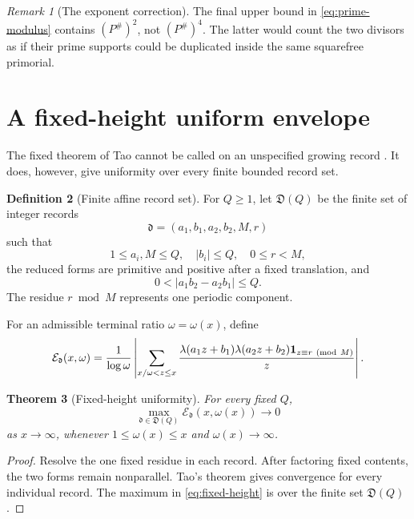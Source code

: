 \documentclass[11pt]{article}
\newtheorem{theorem}{Theorem}[section]
\theoremstyle{definition}
\newtheorem{definition}[theorem]{Definition}
\theoremstyle{remark}
\newtheorem{remark}[theorem]{Remark}
\newcommand{\one}{\mathbf 1}
\begin{document}
\begin{remark}[The exponent correction]
The final upper bound in \eqref{eq:prime-modulus} contains
\((P^\#)^2\), not \((P^\#)^4\).  The latter would count the two
divisors as if their prime supports could be duplicated inside the
same squarefree primorial.
\end{remark}

\section{A fixed-height uniform envelope}

The fixed theorem of Tao cannot be called on an unspecified growing
record \citep{Tao2016LogChowla,WangTPC129}.  It does, however, give
uniformity over every finite bounded record set.

\begin{definition}[Finite affine record set]
\label{def:records}
For \(Q\ge1\), let \(\mathfrak D(Q)\) be the finite set of integer
records
\[
 \mathfrak d=(a_1,b_1,a_2,b_2,M,r)
\]
such that
\[
 1\le a_i,M\le Q,\quad |b_i|\le Q,\quad0\le r<M,
\]
the reduced forms are primitive and positive after a fixed
translation, and
\[
 0<|a_1b_2-a_2b_1|\le Q.
\]
The residue \(r\bmod M\) represents one periodic component.
\end{definition}

For an admissible terminal ratio \(\omega=\omega(x)\), define
\[
 \mathcal E_{\mathfrak d}(x,\omega)
 =
 \frac1{\log\omega}
 \left|
 \sum_{x/\omega<z\le x}
 \frac{
 \lambda(a_1z+b_1)\lambda(a_2z+b_2)
 \one_{z\equiv r\ ({\rm mod}\ M)}
 }z
 \right|.
\]

\begin{theorem}[Fixed-height uniformity]
\label{thm:fixed-height}
For every fixed \(Q\),
\begin{equation}
 \max_{\mathfrak d\in\mathfrak D(Q)}
 \mathcal E_{\mathfrak d}(x,\omega(x))
 \longrightarrow0
\label{eq:fixed-height}
\end{equation}
as \(x\to\infty\), whenever
\(1\le\omega(x)\le x\) and \(\omega(x)\to\infty\).
\end{theorem}

\begin{proof}
Resolve the one fixed residue in each record.  After factoring fixed
contents, the two forms remain nonparallel.  Tao's theorem gives
convergence for every individual record.  The maximum in
\eqref{eq:fixed-height} is over the finite set
\(\mathfrak D(Q)\).
\end{proof}
\end{document}

